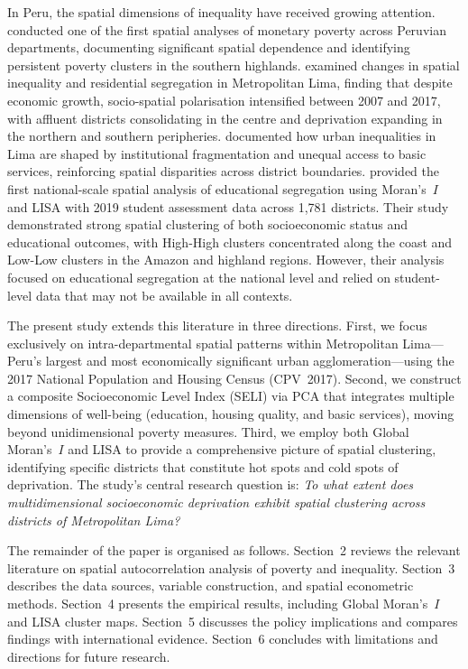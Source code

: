 \documentclass[12pt,a4paper,twoside]{article}
\begin{document}
In Peru, the spatial dimensions of inequality have received growing attention.
\citet{narro2020spatial} conducted one of the first spatial analyses of monetary
poverty across Peruvian departments, documenting significant spatial dependence
and identifying persistent poverty clusters in the southern highlands.
\citet{fernandez2021changes} examined changes in spatial inequality and
residential segregation in Metropolitan Lima, finding that despite economic growth,
socio-spatial polarisation intensified between 2007 and 2017, with affluent
districts consolidating in the centre and deprivation expanding in the northern and
southern peripheries. \citet{desmaison2023building} documented how urban inequalities
in Lima are shaped by institutional fragmentation and unequal access to basic
services, reinforcing spatial disparities across district boundaries.
\citet{alonso2025segregacion} provided the first national-scale spatial
analysis of educational segregation using Moran's~$I$ and LISA with 2019 student
assessment data across 1,781 districts. Their study demonstrated strong spatial
clustering of both socioeconomic status and educational outcomes, with High-High
clusters concentrated along the coast and Low-Low clusters in the Amazon and
highland regions. However, their analysis focused on educational segregation at
the national level and relied on student-level data that may not be available in
all contexts.

The present study extends this literature in three directions. First, we focus
exclusively on intra-departmental spatial patterns within Metropolitan Lima---Peru's
largest and most economically significant urban agglomeration---using the 2017
National Population and Housing Census (CPV~2017). Second, we construct a composite
Socioeconomic Level Index (SELI) via PCA that integrates multiple dimensions of
well-being (education, housing quality, and basic services), moving beyond
unidimensional poverty measures. Third, we employ both Global Moran's~$I$ and LISA
to provide a comprehensive picture of spatial clustering, identifying specific
districts that constitute hot spots and cold spots of deprivation. The study's
central research question is: \textit{To what extent does multidimensional
socioeconomic deprivation exhibit spatial clustering across districts of
Metropolitan Lima?}

The remainder of the paper is organised as follows. Section~2 reviews the relevant
literature on spatial autocorrelation analysis of poverty and inequality. Section~3
describes the data sources, variable construction, and spatial econometric methods.
Section~4 presents the empirical results, including Global Moran's~$I$ and LISA
cluster maps. Section~5 discusses the policy implications and compares findings
with international evidence. Section~6 concludes with limitations and directions
for future research.
\end{document}
